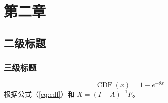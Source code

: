 
\chapter{第二章}
\zhlipsum

\section{二级标题}
\zhlipsum

\subsection{三级标题}
\zhlipsum*[1]
\begin{equation}\label{eq:cdf}
  \operatorname{CDF}(x)=1-e^{-\theta x}
\end{equation}
根据公式（\ref{eq:cdf}）和 $X=(I-A)^{-1}F$。
\zhlipsum